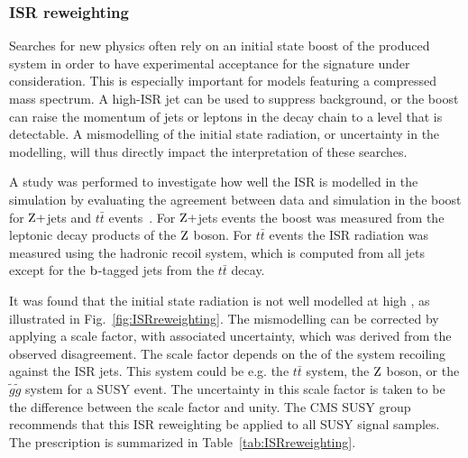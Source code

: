 
% 
% 
% 


\subsubsection{ISR reweighting \label{sec:event_ISRreweighting}}

Searches for new physics often rely on an initial state boost of the produced system in order to
have experimental acceptance for the signature under consideration. This is especially important
for models featuring a compressed mass spectrum. A high-\pt ISR jet can be used to suppress
background, or the boost can raise the momentum of jets or leptons in the decay chain to a level
that is detectable.
A mismodelling of the initial state radiation, or uncertainty in the modelling, will thus
directly impact the interpretation of these searches. 

A study was performed to investigate how well the ISR is
modelled in the simulation by evaluating the agreement between data and simulation in the boost \pt
for $\mathrm{Z}+$jets and $t\bar{t}$ events~\cite{Chatrchyan:2013xna,ISRreweighting}. 
For $\mathrm{Z}+$jets events the boost \pt was measured from the leptonic decay products of the $\mathrm{Z}$
boson. For $t\bar{t}$ events the ISR radiation was measured using the hadronic recoil system, which
is computed from all jets except for the $\mathrm{b}$-tagged jets from the $t\bar{t}$ decay. 

It was found that the initial state radiation is not well modelled at high \pt, as illustrated in
Fig.~\ref{fig:ISRreweighting}. The mismodelling
can be corrected by applying a scale factor, with associated uncertainty, which was derived from the
observed disagreement. The scale factor depends on the \pt of the system recoiling against the ISR
jets. This system could be e.g. the $t\bar{t}$ system, the $\mathrm{Z}$ boson, or the $\tilde{g}\tilde{g}$
system for a SUSY event.  The uncertainty in this scale factor is taken to be the difference
between the scale factor and unity. 
The CMS SUSY group recommends that this ISR reweighting be applied to all SUSY signal samples.
The prescription is summarized in Table~\ref{tab:ISRreweighting}. 

